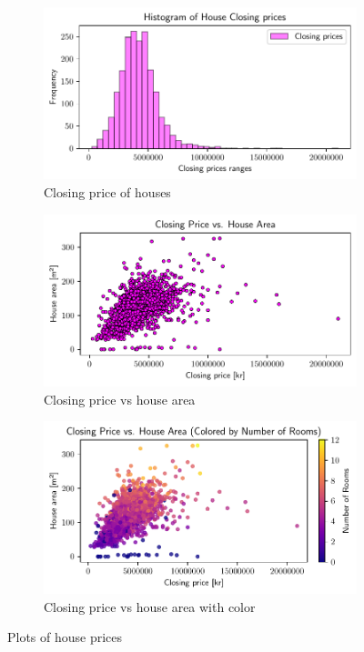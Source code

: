 \documentclass[a4paper]{article}
\begin{document}
\begin{figure}
  \centering
  \begin{subfigure}[a]{\textwidth}
      \centering
      \includegraphics[width=\textwidth]{histogram_closing_price.pdf}
      \caption{Closing price of houses}
      \label{fig:histogram_closing_price}
  \end{subfigure}
  \vfill
  \begin{subfigure}[b]{\textwidth}
      \centering
      \includegraphics[width=\textwidth]{closing_price_house_ares.pdf}
      \caption{Closing price vs house area}
      \label{fig:closing_price_house_ares}
  \end{subfigure}
  \vfill
  \begin{subfigure}[c]{\textwidth}
      \centering
      \includegraphics[width=\textwidth]{closing_price_house_ares_color.pdf}
      \caption{Closing price vs house area with color}
      \label{fig:closing_price_house_ares_color}
  \end{subfigure}
     \caption{Plots of house prices}
     \label{fig:house_plots}
\end{figure}
\end{document}
